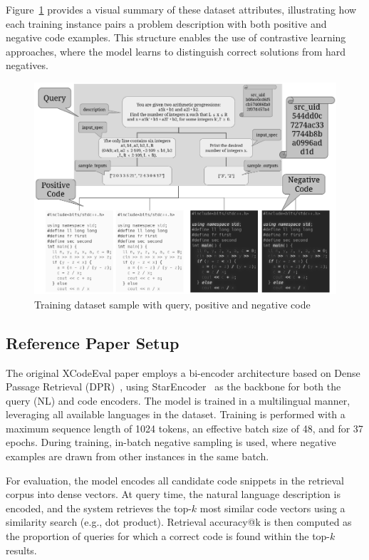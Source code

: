 \documentclass[12pt]{article}
\begin{document}
Figure~\ref{fig:training} provides a visual summary of these dataset attributes, illustrating how each training instance pairs a problem description with both positive and negative code examples. This structure enables the use of contrastive learning approaches, where the model learns to distinguish correct solutions from hard negatives.

\begin{figure}[ht]
\centering
\includegraphics[width=1.0\textwidth]{images/task-gray.png}
\caption{Training dataset sample with query, positive and negative code}
\label{fig:training}
\end{figure}

\subsection{Reference Paper Setup}

The original XCodeEval paper employs a bi-encoder architecture based on Dense Passage Retrieval (DPR)~\cite{Karpukhin2020}, using StarEncoder~\cite{Li2023} as the backbone for both the query (NL) and code encoders. The model is trained in a multilingual manner, leveraging all available languages in the dataset. Training is performed with a maximum sequence length of 1024 tokens, an effective batch size of 48, and for 37 epochs. During training, in-batch negative sampling is used, where negative examples are drawn from other instances in the same batch.

For evaluation, the model encodes all candidate code snippets in the retrieval corpus into dense vectors. At query time, the natural language description is encoded, and the system retrieves the top-$k$ most similar code vectors using a similarity search (e.g., dot product). Retrieval accuracy@k is then computed as the proportion of queries for which a correct code is found within the top-$k$ results.
\end{document}
